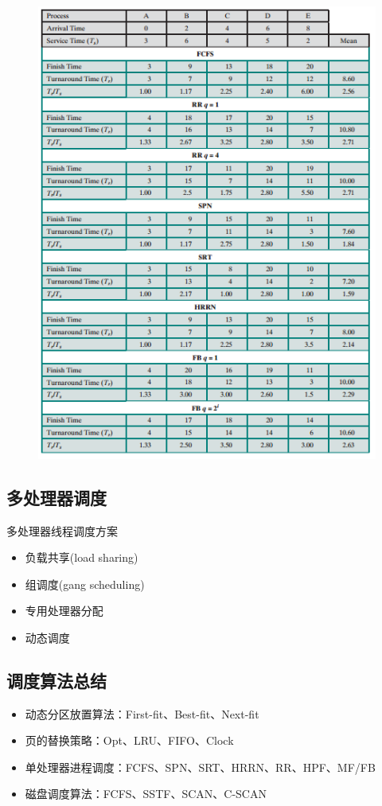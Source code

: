 \begin{analysis}
\begin{figure}[H]
        \includegraphics[width=0.8\linewidth]{fig/short-term-scheduling-all-2.png}
    \end{figure}
\end{analysis}

\subsection{多处理器调度}
多处理器线程调度方案
\begin{itemize}
    \item 负载共享(load sharing)
    \item 组调度(gang scheduling)
    \item 专用处理器分配
    \item 动态调度
\end{itemize}

\subsection{调度算法总结}
\begin{itemize}
    \item 动态分区放置算法：First-fit、Best-fit、Next-fit
    \item 页的替换策略：Opt、LRU、FIFO、Clock
    \item 单处理器进程调度：FCFS、SPN、SRT、HRRN、RR、HPF、MF/FB
    \item 磁盘调度算法：FCFS、SSTF、SCAN、C-SCAN
\end{itemize}

